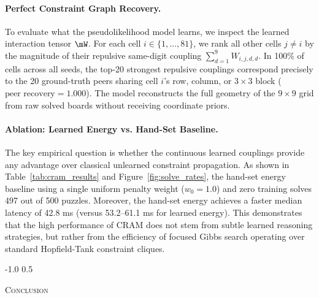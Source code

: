 \documentclass{article} %
\makeatletter
\renewcommand{\section}{\@startsection{section}{1}{\z@}%
  {-1.0\baselineskip}%
  {0.5\baselineskip}%
  {\normalfont\fontsize{12}{14}\selectfont\raggedright\scshape}}
\makeatother
\begin{document}
\paragraph{Perfect Constraint Graph Recovery.}
To evaluate what the pseudolikelihood model learns, we inspect the learned interaction tensor $\mW$. For each cell $i \in \{1, \dots, 81\}$, we rank all other cells $j \neq i$ by the magnitude of their repulsive same-digit coupling $\sum_{d=1}^9 W_{i,j,d,d}$. In 100\% of cells across all seeds, the top-20 strongest repulsive couplings correspond precisely to the 20 ground-truth peers sharing cell $i$'s row, column, or $3 \times 3$ block ($\text{peer recovery} = 1.000$). The model reconstructs the full geometry of the $9 \times 9$ grid from raw solved boards without receiving coordinate priors.

\paragraph{Ablation: Learned Energy vs. Hand-Set Baseline.}
The key empirical question is whether the continuous learned couplings provide any advantage over classical unlearned constraint propagation. As shown in Table~\ref{tab:cram_results} and Figure~\ref{fig:solve_rates}, the hand-set energy baseline using a single uniform penalty weight ($w_0 = 1.0$) and zero training solves 497 out of 500 puzzles. Moreover, the hand-set energy achieves a faster median latency of 42.8 ms (versus 53.2--61.1 ms for learned energy). This demonstrates that the high performance of CRAM does not stem from subtle learned reasoning strategies, but rather from the efficiency of focused Gibbs search operating over standard Hopfield-Tank constraint cliques.

\section{\textsc{Conclusion}}
\label{sec:conclusion}
\end{document}
